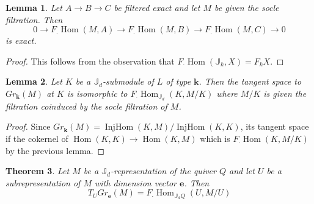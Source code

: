 \documentclass{amsart}
\numberwithin{equation}{section}
\newtheorem{theorem}{Theorem}[section]
\newtheorem{lemma}[theorem]{Lemma}
\theoremstyle{definition}
\def\JJ{\mathbb{J}}
\def\bfe{\mathbf{e}}
\def\bfk{\mathbf{k}}
\def\Hom{\operatorname{Hom}}
\def\IHom{\operatorname{InjHom}}
\begin{document}
\begin{lemma}
Let $A\to B\to C$ be filtered exact and let $M$ be given the socle filtration. Then
\[
	0\to F_\cdot\Hom(M,A)\to F_\cdot\Hom(M,B)\to F_\cdot\Hom(M,C)\to0
\]
is exact.
\end{lemma}

\begin{proof}
This follows from the observation that $F_\cdot \Hom(\JJ_k,X)=F_kX$.
\end{proof}

\begin{lemma}
Let $K$ be a $\JJ_d$-submodule of $L$ of type $\bfk$. Then the tangent space to $Gr_\bfk(M)$ at $K$ is isomorphic to $F_\cdot \Hom_{\JJ_d}(K,M/K)$ where $M/K$ is given the filtration coinduced by the socle filtration of $M$.
\end{lemma}

\begin{proof}
Since $Gr_\bfk(M)=\IHom(K,M)/\IHom(K,K)$, its tangent space if the cokernel of $\Hom(K,K)\to \Hom(K,M)$ which is $F_\cdot\Hom(K,M/K)$ by the previous lemma.
\end{proof}

\begin{theorem}
Let $M$ be a $\JJ_d$-representation of the quiver $Q$ and let $U$ be a subrepresentation of $M$ with dimension vector $\bfe$. Then
\[
	T_UGr_\bfe (M)=F_\cdot \Hom_{\JJ_dQ}(U,M/U)
\]
\end{theorem}
\end{document}
